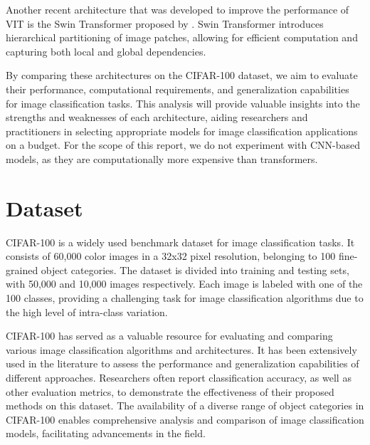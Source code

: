 \documentclass{article}
\begin{document}

Another recent architecture that was developed to improve the performance of VIT is the Swin Transformer proposed by \cite{DBLP:journals/corr/abs-2103-14030}.
Swin Transformer introduces hierarchical partitioning of image patches, allowing for efficient computation and capturing both local and global dependencies.

By comparing these architectures on the CIFAR-100 dataset, we aim to evaluate their performance, computational requirements, and generalization capabilities for image classification tasks.
This analysis will provide valuable insights into the strengths and weaknesses of each architecture, aiding researchers and practitioners in selecting appropriate models for image classification applications on a budget.
For the scope of this report, we do not experiment with CNN-based models, as they are computationally more expensive than transformers.

\section{Dataset}
CIFAR-100 \cite{Krizhevsky09learningmultiple} is a widely used benchmark dataset for image classification tasks.
It consists of 60,000 color images in a 32x32 pixel resolution, belonging to 100 fine-grained object categories.
The dataset is divided into training and testing sets, with 50,000 and 10,000 images respectively.
Each image is labeled with one of the 100 classes, providing a challenging task for image classification algorithms due to the high level of intra-class variation.

CIFAR-100 has served as a valuable resource for evaluating and comparing various image classification algorithms and architectures.
It has been extensively used in the literature to assess the performance and generalization capabilities of different approaches.
Researchers often report classification accuracy, as well as other evaluation metrics, to demonstrate the effectiveness of their proposed methods on this dataset.
The availability of a diverse range of object categories in CIFAR-100 enables comprehensive analysis and comparison of image classification models, facilitating advancements in the field.
\end{document}
